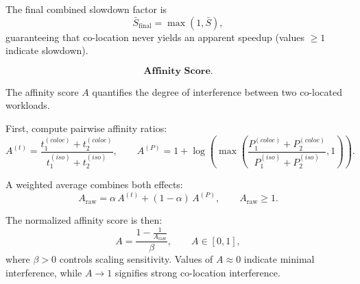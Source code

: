 The final combined slowdown factor is
\[
    \bar{S}_{\text{final}} = \max(1, \bar{S}),
\]
guaranteeing that co-location never yields an apparent
speedup (values \(\ge 1\) indicate slowdown).

\[
    \textbf{Affinity Score.}
\]

The affinity score \(A\) quantifies the degree of
interference between two co-located workloads.

First, compute pairwise affinity ratios:
\[
    A^{(t)} =
    \frac{t_1^{(coloc)} + t_2^{(coloc)}}
    {t_1^{(iso)} + t_2^{(iso)}},
    \qquad
    A^{(P)} =
    1 + \log\!\left(
    \max\!\left(
    \frac{P_1^{(coloc)} + P_2^{(coloc)}}
    {P_1^{(iso)} + P_2^{(iso)}},
    1
    \right)
    \right).
\]

A weighted average combines both effects:
\[
    A_{\text{raw}} =
    \alpha\, A^{(t)} + (1 - \alpha)\, A^{(P)},
    \qquad A_{\text{raw}} \ge 1.
\]

The normalized affinity score is then:
\[
    A =
    \frac{1 - \frac{1}{A_{\text{raw}}}}{\beta},
    \qquad A \in [0, 1],
\]
where \(\beta > 0\) controls scaling sensitivity.
Values of \(A \approx 0\) indicate minimal interference,
while \(A \to 1\) signifies strong co-location interference.

